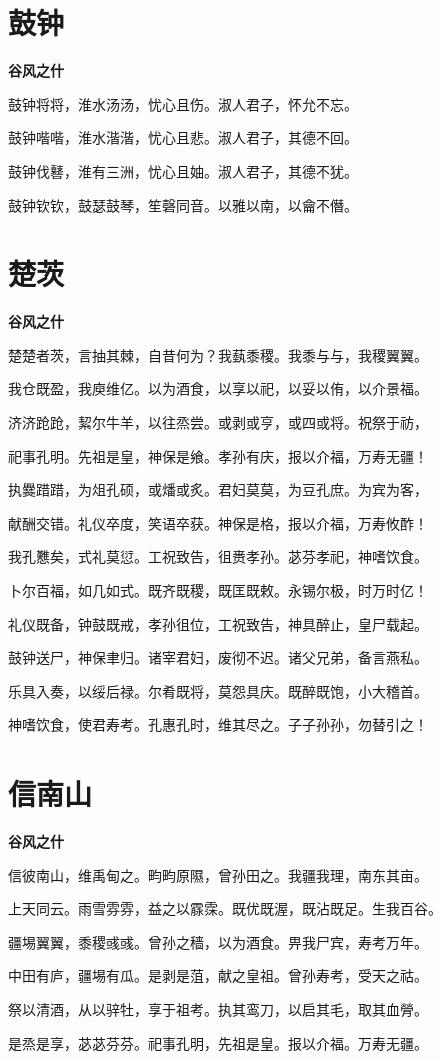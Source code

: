 \documentclass[12pt,a4paper]{ctexbook}
\begin{document}
\section{鼓钟}
\textbf{谷风之什}\par\vspace{0.5em}
鼓钟将将，淮水汤汤，忧心且伤。淑人君子，怀允不忘。\par
鼓钟喈喈，淮水湝湝，忧心且悲。淑人君子，其德不回。\par
鼓钟伐鼛，淮有三洲，忧心且妯。淑人君子，其德不犹。\par
鼓钟钦钦，鼓瑟鼓琴，笙磬同音。以雅以南，以龠不僭。\par

\section{楚茨}
\textbf{谷风之什}\par\vspace{0.5em}
楚楚者茨，言抽其棘，自昔何为？我蓺黍稷。我黍与与，我稷翼翼。\par
我仓既盈，我庾维亿。以为酒食，以享以祀，以妥以侑，以介景福。\par
济济跄跄，絜尔牛羊，以往烝尝。或剥或亨，或四或将。祝祭于祊，\par
祀事孔明。先祖是皇，神保是飨。孝孙有庆，报以介福，万寿无疆！\par
执爨踖踖，为俎孔硕，或燔或炙。君妇莫莫，为豆孔庶。为宾为客，\par
献酬交错。礼仪卒度，笑语卒获。神保是格，报以介福，万寿攸酢！\par
我孔戁矣，式礼莫愆。工祝致告，徂赉孝孙。苾芬孝祀，神嗜饮食。\par
卜尔百福，如几如式。既齐既稷，既匡既敕。永锡尔极，时万时亿！\par
礼仪既备，钟鼓既戒，孝孙徂位，工祝致告，神具醉止，皇尸载起。\par
鼓钟送尸，神保聿归。诸宰君妇，废彻不迟。诸父兄弟，备言燕私。\par
乐具入奏，以绥后禄。尔肴既将，莫怨具庆。既醉既饱，小大稽首。\par
神嗜饮食，使君寿考。孔惠孔时，维其尽之。子子孙孙，勿替引之！\par

\section{信南山}
\textbf{谷风之什}\par\vspace{0.5em}
信彼南山，维禹甸之。畇畇原隰，曾孙田之。我疆我理，南东其亩。\par
上天同云。雨雪雰雰，益之以霡霂。既优既渥，既沾既足。生我百谷。\par
疆埸翼翼，黍稷彧彧。曾孙之穑，以为酒食。畀我尸宾，寿考万年。\par
中田有庐，疆埸有瓜。是剥是菹，献之皇祖。曾孙寿考，受天之祜。\par
祭以清酒，从以骍牡，享于祖考。执其鸾刀，以启其毛，取其血膋。\par
是烝是享，苾苾芬芬。祀事孔明，先祖是皇。报以介福。万寿无疆。\par
\end{document}
